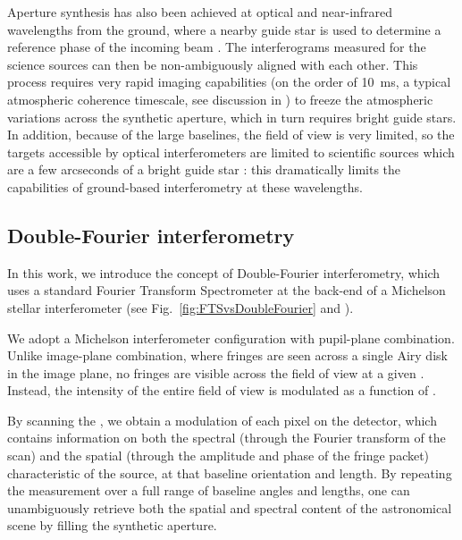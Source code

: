 Aperture synthesis has also been achieved at optical and near-infrared wavelengths from the ground, where a nearby guide star is used to determine a reference phase of the incoming beam \citep[e.g.][]{Monnier:2004fd,Gillessen:2010fo}. The interferograms measured for the science sources can then be non-ambiguously aligned with each other. This process requires very rapid imaging capabilities (on the order of \SI{10}{\milli\second}, a typical atmospheric coherence timescale, see discussion in \cite{Mariotti:1988vea}) to freeze the atmospheric variations across the synthetic aperture, which in turn requires bright guide stars. In addition, because of the large baselines, the field of view is very limited, so the targets accessible by optical interferometers are limited to scientific sources which are a few arcseconds of a bright guide star \citep{Glindemann:2000bf}: this dramatically limits the capabilities of ground-based interferometry at these wavelengths.


\subsection{Double-Fourier interferometry}


In this work, we introduce the concept of Double-Fourier interferometry, which uses a standard Fourier Transform Spectrometer at the back-end of a Michelson stellar interferometer (see Fig.~\ref{fig:FTSvsDoubleFourier} and \citet{Mariotti:1988vea}). 


We adopt a Michelson interferometer configuration with pupil-plane combination. Unlike image-plane combination, where fringes are seen across a single Airy disk in the image plane, no fringes are visible across the field of view at a given \OPD. Instead, the intensity of the entire field of view is modulated as a function of \OPD. 

By scanning the \OPD, we obtain a modulation of each pixel on the detector, which contains information on both the spectral (through the Fourier transform of the scan) and the spatial (through the amplitude and phase of the fringe packet) characteristic of the source, at that baseline orientation and length. By repeating the measurement over a full range of baseline angles and lengths, one can unambiguously retrieve both the spatial and spectral content of the astronomical scene by filling the synthetic aperture. 

